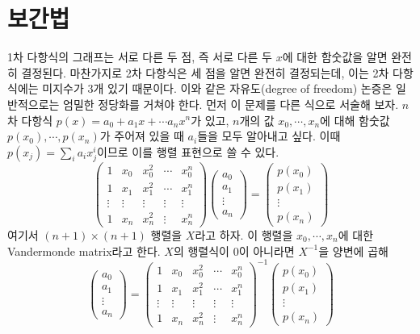 \section{보간법}
1차 다항식의 그래프는 서로 다른 두 점, 즉 서로 다른 두 $x$에 대한 함숫값을 알면 완전히 결정된다. 마찬가지로 2차 다항식은 세 점을 알면 완전히 결정되는데, 이는 2차 다항식에는 미지수가 3개 있기 때문이다. 이와 같은 자유도(degree of freedom) 논증은 일반적으로는 엄밀한 정당화를 거쳐야 한다. 먼저 이 문제를 다른 식으로 서술해 보자. $n$차 다항식 $p(x)=a_0+a_1x+\cdots a_nx^n$가 있고, $n$개의 값 $x_0, \cdots, x_n$에 대해 함숫값 $p(x_0), \cdots, p(x_n)$가 주어져 있을 때 $a_i$들을 모두 알아내고 싶다. 이때 $p(x_j)=\sum_i a_i x_j^i$이므로 이를 행렬 표현으로 쓸 수 있다. 
\begin{equation*}
    \begin{pmatrix}
1 & x_0 & x_0^2 &\cdots &x_0^n\\
1 & x_1 & x_1^2 &\cdots &x_1^n\\
\vdots & \vdots &\vdots &\vdots &\vdots\\
1 & x_n & x_n^2 &\vdots &x_n^n
\end{pmatrix}
\begin{pmatrix}
a_0\\
a_1\\
\vdots\\
a_n
\end{pmatrix}
=
\begin{pmatrix}
p(x_0)\\
p(x_1)\\
\vdots\\
p(x_n)
\end{pmatrix}
\end{equation*}
여기서 $(n+1)\times(n+1)$ 행렬을 $X$라고 하자. 이 행렬을 $x_0, \cdots, x_n$에 대한 Vandermonde matrix라고 한다. $X$의 행렬식이 0이 아니라면 $X^{-1}$을 양변에 곱해 
\begin{equation*}
\begin{pmatrix}
a_0\\
a_1\\
\vdots\\
a_n
\end{pmatrix}
=
    \begin{pmatrix}
1 & x_0 & x_0^2 &\cdots &x_0^n\\
1 & x_1 & x_1^2 &\cdots &x_1^n\\
\vdots & \vdots &\vdots &\vdots &\vdots\\
1 & x_n & x_n^2 &\vdots &x_n^n
\end{pmatrix}^{-1}
\begin{pmatrix}
p(x_0)\\
p(x_1)\\
\vdots\\
p(x_n)
\end{pmatrix}
\end{equation*}
